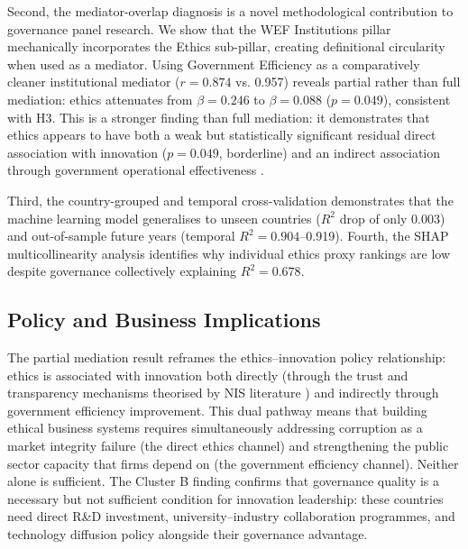 \documentclass[pdflatex,sn-apa]{sn-jnl}
\begin{document}
Second, the mediator-overlap diagnosis is a novel methodological contribution to governance panel research. We show that the WEF Institutions pillar mechanically incorporates the Ethics sub-pillar, creating definitional circularity when used as a mediator. Using Government Efficiency as a comparatively cleaner institutional mediator ($r=0.874$ vs. 0.957) reveals partial rather than full mediation: ethics attenuates from $\beta=0.246$ to $\beta=0.088$ ($p=0.049$), consistent with H3. This is a stronger finding than full mediation: it demonstrates that ethics appears to have both a weak but statistically significant residual direct association with innovation ($p=0.049$, borderline) and an indirect association through government operational effectiveness \citep{north1990,scott2001}.

Third, the country-grouped and temporal cross-validation demonstrates that the machine learning model generalises to unseen countries ($R^2$ drop of only 0.003) and out-of-sample future years (temporal $R^2=0.904$--0.919). Fourth, the SHAP multicollinearity analysis \citep{lundberg2017} identifies why individual ethics proxy rankings are low despite governance collectively explaining $R^2=0.678$.

\subsection{Policy and Business Implications}

The partial mediation result reframes the ethics--innovation policy relationship: ethics is associated with innovation both directly (through the trust and transparency mechanisms theorised by NIS literature \citep{lundvall1992,nelson1993}) and indirectly through government efficiency improvement. This dual pathway means that building ethical business systems requires simultaneously addressing corruption as a market integrity failure (the direct ethics channel) and strengthening the public sector capacity that firms depend on (the government efficiency channel). Neither alone is sufficient. The Cluster B finding confirms that governance quality is a necessary but not sufficient condition for innovation leadership: these countries need direct R\&D investment, university--industry collaboration programmes, and technology diffusion policy alongside their governance advantage.
\end{document}
